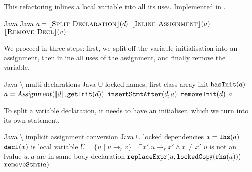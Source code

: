 \subsection{}
This refactoring inlines a local variable into all its uses. Implemented in .

\begin{algorithm}
\caption{$\refactoring{Inline Temp}(d : \type{LocalVarDecl})$}
\begin{algorithmic}[1]
\REQUIRE Java
\ENSURE Java
\medskip
\STATE $a = \lfloor\textsc{Split Declaration}\rfloor(d)$
\STATE $\lfloor\textsc{Inline Assignment}\rfloor(a)$
\STATE $\lfloor\textsc{Remove Decl}\rfloor(v)$
\end{algorithmic}
\end{algorithm}

We proceed in three steps: first, we split off the variable initialisation into an assignment, then inline all uses of the assignment, and finally remove the variable.

\begin{algorithm}
\caption{$\refactoring{Split Declaration}(d : \type{LocalVarDecl}) : \type{Assignment}$}
\begin{algorithmic}[1]
\REQUIRE Java $\setminus$ multi-declarations
\ENSURE Java $\cup$ locked names, first-class array init
\medskip
\STATE \assert $\text{\texttt{hasInit}}(d)$
\STATE $a = \text{\textsl{Assignment}}(\llbracket d\rrbracket, \text{\texttt{getInit}}(d))$  
\STATE $\text{\texttt{insertStmtAfter}}(d, a)$
\STATE $\text{\texttt{removeInit}}(d)$
\RETURN $a$
\end{algorithmic}
\end{algorithm}

To split a variable declaration, it needs to have an initialiser, which we turn into its own statement.

\begin{algorithm}
\caption{$\refactoring{Inline Assignment}(a : \type{Assignment})$}
\begin{algorithmic}[1]
\REQUIRE Java $\setminus$ implicit assignment conversion
\ENSURE Java $\cup$ locked dependencies
\medskip
\STATE $x = \text{\texttt{lhs}}(a)$
\STATE \assert $\text{\texttt{decl}}(x)$ is local variable
\STATE $U = \{ u \mid u\rightarrow_r x\}$
  \STATE \assert $\neg\exists x'.u\rightarrow_r x' \wedge x\neq x'$
  \STATE \assert $u$ is not an lvalue
  \STATE \assert $u,a$ are in same body declaration
  \STATE $\text{\texttt{replaceExpr}}(u, \text{\texttt{lockedCopy}}(\text{\texttt{rhs}}(a)))$
\ENDFOR
{}
  \STATE $\text{\texttt{removeStmt}}(a)$
\ENDIF
\end{algorithmic}
\end{algorithm}

